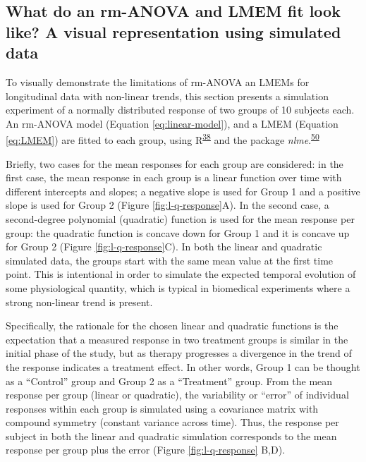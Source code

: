 \documentclass[
]{article}
\begin{document}
\hypertarget{simulation}{%
\subsection{What do an rm-ANOVA and LMEM fit look like? A visual representation using simulated data}\label{simulation}}

To visually demonstrate the limitations of rm-ANOVA an LMEMs for longitudinal data with non-linear trends, this section presents a simulation experiment of a normally distributed response of two groups of 10 subjects each. An rm-ANOVA model (Equation \eqref{eq:linear-model}), and a LMEM (Equation \eqref{eq:LMEM}) are fitted to each group, using R\textsuperscript{\protect\hyperlink{ref-r}{38}} and the package \emph{nlme}.\textsuperscript{\protect\hyperlink{ref-nlme}{50}}

Briefly, two cases for the mean responses for each group are considered: in the first case, the mean response in each group is a linear function over time with different intercepts and slopes; a negative slope is used for Group 1 and a positive slope is used for Group 2 (Figure \ref{fig:l-q-response}A). In the second case, a second-degree polynomial (quadratic) function is used for the mean response per group: the quadratic function is concave down for Group 1 and it is concave up for Group 2 (Figure \ref{fig:l-q-response}C). In both the linear and quadratic simulated data, the groups start with the same mean value at the first time point. This is intentional in order to simulate the expected temporal evolution of some physiological quantity, which is typical in biomedical experiments where a strong non-linear trend is present.

Specifically, the rationale for the chosen linear and quadratic functions is the expectation that a measured response in two treatment groups is similar in the initial phase of the study, but as therapy progresses a divergence in the trend of the response indicates a treatment effect. In other words, Group 1 can be thought as a ``Control'' group and Group 2 as a ``Treatment'' group. From the mean response per group (linear or quadratic), the variability or ``error'' of individual responses within each group is simulated using a covariance matrix with compound symmetry (constant variance across time). Thus, the response per subject in both the linear and quadratic simulation corresponds to the mean response per group plus the error (Figure \ref{fig:l-q-response} B,D).
\end{document}
